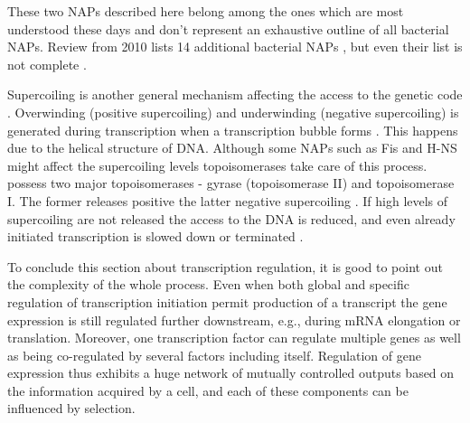 These two NAPs described here belong among the ones which are most understood these days and don't represent an exhaustive outline of all bacterial NAPs.
Review from 2010 lists 14 additional bacterial NAPs \cite{dillon2010bacterial}, but even their list is not complete \cite{aznar2013hha}.

Supercoiling is another general mechanism affecting the access to the genetic code \cite{brahms1985activation}.
Overwinding (positive supercoiling) and underwinding (negative supercoiling) is generated during transcription when a transcription bubble forms \cite{wu1988transcription}.
This happens due to the helical structure of DNA.
Although some NAPs such as Fis and H-NS might affect the supercoiling levels \cite{ouafa2012nucleoid} topoisomerases take care of this process.
 possess two major topoisomerases - gyrase (topoisomerase II) and topoisomerase I.
The former releases positive the latter negative supercoiling \cite{wang1971interaction, gellert1976dna}.
If high levels of supercoiling are not released the access to the DNA is reduced, and even already initiated transcription is slowed down or terminated \cite{chong2014mechanism}.

To conclude this section about transcription regulation, it is good to point out the complexity of the whole process.
Even when both global and specific regulation of transcription initiation permit production of a transcript the gene expression is still regulated further downstream, e.g., during mRNA elongation or translation.
Moreover, one transcription factor can regulate multiple genes as well as being co-regulated by several factors including itself.
Regulation of gene expression thus exhibits a huge network of mutually controlled outputs based on the information acquired by a cell, and each of these components can be influenced by selection.



